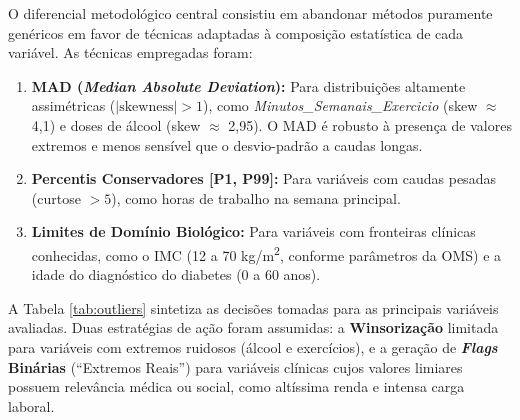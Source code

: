 \documentclass[12pt, a4paper]{article}
\begin{document}
    O diferencial metodológico central consistiu em abandonar métodos puramente genéricos em favor de técnicas adaptadas à composição estatística de cada variável. As técnicas empregadas foram:

    \begin{enumerate}
        \item \textbf{MAD (\textit{Median Absolute Deviation}):} Para distribuições altamente assimétricas ($|\text{skewness}| > 1$), como \textit{Minutos\_Semanais\_Exercicio} (skew $\approx$ 4,1) e doses de álcool (skew $\approx$ 2,95). O MAD é robusto à presença de valores extremos e menos sensível que o desvio-padrão a caudas longas.

        \item \textbf{Percentis Conservadores [P1, P99]:} Para variáveis com caudas pesadas (curtose $> 5$), como horas de trabalho na semana principal.

        \item \textbf{Limites de Domínio Biológico:} Para variáveis com fronteiras clínicas conhecidas, como o IMC (12 a 70 kg/m\textsuperscript{2}, conforme parâmetros da OMS) e a idade do diagnóstico do diabetes (0 a 60 anos).
    \end{enumerate}

    A Tabela \ref{tab:outliers} sintetiza as decisões tomadas para as principais variáveis avaliadas. Duas estratégias de ação foram assumidas: a \textbf{Winsorização} limitada para variáveis com extremos ruidosos (álcool e exercícios), e a geração de \textbf{\textit{Flags} Binárias} (``Extremos Reais'') para variáveis clínicas cujos valores limiares possuem relevância médica ou social, como altíssima renda e intensa carga laboral.

    \begin{table}[h]
    \centering
    \caption{Decisões de Tratamento de Outliers por Variável}
    \label{tab:outliers}
    \end{table}
\end{document}
